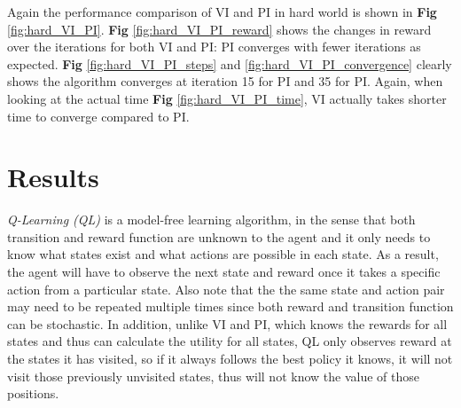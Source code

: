 \documentclass[10pt]{article}
\begin{document}
Again the performance comparison of VI and PI in hard world is shown in \textbf{Fig} \ref{fig:hard_VI_PI}. \textbf{Fig} \ref{fig:hard_VI_PI_reward} shows the changes in reward over the iterations for both VI and PI: PI converges with fewer iterations as expected. \textbf{Fig} \ref{fig:hard_VI_PI_steps} and \ref{fig:hard_VI_PI_convergence} clearly shows the algorithm converges at iteration 15 for PI and 35 for PI. Again, when looking at the actual time \textbf{Fig} \ref{fig:hard_VI_PI_time}, VI actually takes shorter time to converge compared to PI.






\section{Results} \label{results}

\textit{Q-Learning (QL)} is a model-free learning algorithm, in the sense that both transition and reward function are unknown to the agent and it only needs to know what states exist and what actions are possible in each state. As a result, the agent will have to observe the next state and reward once it takes a specific action from a particular state. Also note that the the same state and action pair may need to be repeated multiple times since both reward and transition function can be stochastic. In addition, unlike VI and PI, which knows the rewards for all states and thus can calculate the utility for all states, QL only observes reward at the states it has visited, so if it always follows the best policy it knows, it will not visit those previously unvisited states, thus will not know the value of those positions.
\end{document}
